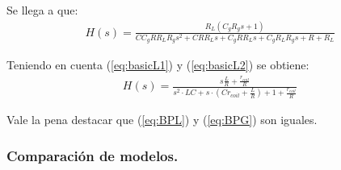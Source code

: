 Se llega a que:
\begin{align}H(s)=\frac{R_{L} \left(C_{g} R_{g} s + 1\right)}{C C_{g} R R_{L} R_{g} s^{2} + C R R_{L} s + C_{g} R R_{L} s + C_{g} R_{L} R_{g} s + R + R_{L}}
\end{align}

Teniendo en cuenta (\ref{eq:basicL1}) y (\ref{eq:basicL2}) se obtiene:
\begin{align}H(s)=\frac{s\frac{L}{R}+\frac{r_{coil}}{R}}{s^2\cdot LC +s \cdot (Cr_{coil}+\frac{L}{R})+1+\frac{r_{coil}}{R}}
\label{eq:BPG}
\end{align}

Vale la pena destacar que (\ref{eq:BPL}) y (\ref{eq:BPG}) son iguales.
\subsubsection{Comparación de modelos.}

